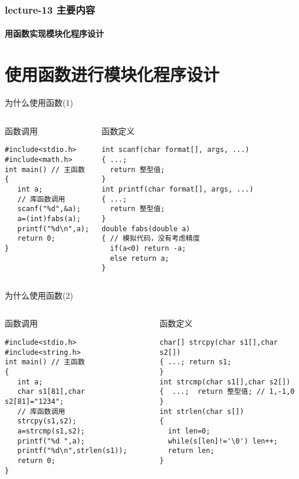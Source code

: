 \begin{frame}[shrink]
  \frametitle{lecture-13 主要内容}
  \framesubtitle{用函数实现模块化程序设计}
  \tableofcontents
\end{frame}

\section{使用函数进行模块化程序设计}

\begin{frame}{为什么使用函数(1)}
\tiny
\begin{columns}[T]
\begin{beamerboxesrounded}{函数调用}
\begin{lstlisting}
#include<stdio.h>
#include<math.h>
int main() // 主函数
{
   int a;
   // 库函数调用
   scanf("%d",&a); 
   a=(int)fabs(a); 
   printf("%d\n",a);
   return 0; 
}
\end{lstlisting}
\end{beamerboxesrounded}
\begin{beamerboxesrounded}{函数定义}
\begin{lstlisting}
int scanf(char format[], args, ...)
{ ...;
  return 整型值;
}
int printf(char format[], args, ...)
{ ...;
  return 整型值;
}
double fabs(double a)
{ // 模拟代码，没有考虑精度
  if(a<0) return -a;
  else return a;
}
\end{lstlisting}
\end{beamerboxesrounded}
\end{columns}
\end{frame}

\begin{frame}{为什么使用函数(2)}
\tiny
\begin{columns}[T]
\begin{beamerboxesrounded}{函数调用}
\begin{lstlisting}
#include<stdio.h>
#include<string.h>
int main() // 主函数
{
   int a;
   char s1[81],char s2[81]="1234";
   // 库函数调用 
   strcpy(s1,s2); 
   a=strcmp(s1,s2);
   printf("%d ",a);
   printf("%d\n",strlen(s1));
   return 0; 
}
\end{lstlisting}
\end{beamerboxesrounded}
\begin{beamerboxesrounded}{函数定义}
\begin{lstlisting}
char[] strcpy(char s1[],char s2[])
{ ...; return s1; 
}
int strcmp(char s1[],char s2[])
{  ...;  return 整型值; // 1,-1,0
}
int strlen(char s[])
{
  int len=0;
  while(s[len]!='\0') len++;
  return len;
}
\end{lstlisting}
\end{beamerboxesrounded}
\end{columns}
\end{frame}

